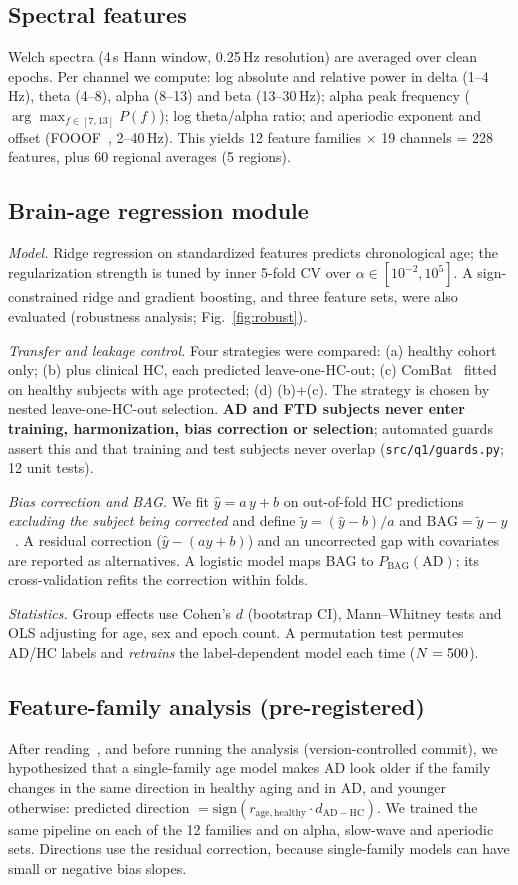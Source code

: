 \documentclass[journal]{IEEEtran}
\begin{document}
\subsection{Spectral features}
Welch spectra (4\,s Hann window, 0.25\,Hz resolution) are averaged over clean epochs. Per channel we compute: log absolute and relative power in delta (1--4\,Hz), theta (4--8), alpha (8--13) and beta (13--30\,Hz); alpha peak frequency ($\arg\max_{f\in[7,13]}P(f)$); log theta/alpha ratio; and aperiodic exponent and offset (FOOOF~\cite{fooof}, 2--40\,Hz). This yields 12 feature families $\times$ 19 channels = 228 features, plus 60 regional averages (5 regions).

\subsection{Brain-age regression module}
\emph{Model.} Ridge regression on standardized features predicts chronological age; the regularization strength is tuned by inner 5-fold CV over $\alpha\in[10^{-2},10^{5}]$. A sign-constrained ridge and gradient boosting, and three feature sets, were also evaluated (robustness analysis; Fig.~\ref{fig:robust}).

\emph{Transfer and leakage control.} Four strategies were compared: (a) healthy cohort only; (b) plus clinical HC, each predicted leave-one-HC-out; (c) ComBat~\cite{johnson2007,fortin2018} fitted on healthy subjects with age protected; (d) (b)+(c). The strategy is chosen by nested leave-one-HC-out selection. \textbf{AD and FTD subjects never enter training, harmonization, bias correction or selection}; automated guards assert this and that training and test subjects never overlap (\texttt{src/q1/guards.py}; 12 unit tests).

\emph{Bias correction and BAG.} We fit $\hat y=a\,y+b$ on out-of-fold HC predictions \emph{excluding the subject being corrected} and define $\tilde y=(\hat y-b)/a$ and $\mathrm{BAG}=\tilde y-y$~\cite{delange2020}. A residual correction ($\hat y-(ay+b)$) and an uncorrected gap with covariates are reported as alternatives. A logistic model maps BAG to $P_\mathrm{BAG}(\mathrm{AD})$; its cross-validation refits the correction within folds.

\emph{Statistics.} Group effects use Cohen's $d$ (bootstrap CI), Mann--Whitney tests and OLS adjusting for age, sex and epoch count. A permutation test permutes AD/HC labels and \emph{retrains} the label-dependent model each time ($N=500{}$).

\subsection{Feature-family analysis (pre-registered)}
After reading~\cite{otero2026}, and before running the analysis (version-controlled commit), we hypothesized that a single-family age model makes AD look older if the family changes in the same direction in healthy aging and in AD, and younger otherwise: predicted direction $=\mathrm{sign}(r_\mathrm{age,healthy}\cdot d_\mathrm{AD-HC})$. We trained the same pipeline on each of the 12 families and on alpha, slow-wave and aperiodic sets. Directions use the residual correction, because single-family models can have small or negative bias slopes.
\end{document}
